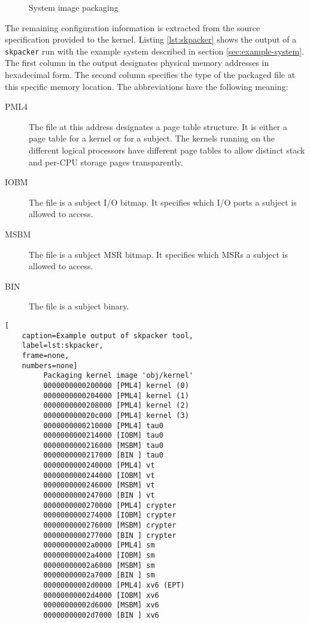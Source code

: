 \begin{figure}[h]
	\centering
	
	\caption{System image packaging}
	\label{fig:image-packaging}
\end{figure}

The remaining configuration information is extracted from the source
specification provided to the kernel. Listing \ref{lst:skpacker} shows the
output of a \texttt{skpacker} run with the example system described in section
\ref{sec:example-system}. The first column in the output designates physical
memory addresses in hexadecimal form. The second column specifies the type of
the packaged file at this specific memory location. The abbreviations have the
following meaning:

\begin{description}
	\item[PML4] The file at this address designates a page table structure. It
		is either a page table for a kernel or for a subject. The kernels
		running on the different logical processors have different page tables
		to allow distinct stack and per-CPU storage pages transparently.
	\item[IOBM] The file is a subject I/O bitmap. It specifies which I/O ports a
		subject is allowed to access.
	\item[MSBM] The file is a subject MSR bitmap. It specifies which MSRs a
		subject is allowed to access.
	\item[BIN] The file is a subject binary.
\end{description}

\begin{lstlisting}[
	caption=Example output of skpacker tool,
	label=lst:skpacker,
	frame=none,
	numbers=none]
         Packaging kernel image 'obj/kernel'
         0000000000200000 [PML4] kernel (0)
         0000000000204000 [PML4] kernel (1)
         0000000000208000 [PML4] kernel (2)
         000000000020c000 [PML4] kernel (3)
         0000000000210000 [PML4] tau0
         0000000000214000 [IOBM] tau0
         0000000000216000 [MSBM] tau0
         0000000000217000 [BIN ] tau0
         0000000000240000 [PML4] vt
         0000000000244000 [IOBM] vt
         0000000000246000 [MSBM] vt
         0000000000247000 [BIN ] vt
         0000000000270000 [PML4] crypter
         0000000000274000 [IOBM] crypter
         0000000000276000 [MSBM] crypter
         0000000000277000 [BIN ] crypter
         00000000002a0000 [PML4] sm
         00000000002a4000 [IOBM] sm
         00000000002a6000 [MSBM] sm
         00000000002a7000 [BIN ] sm
         00000000002d0000 [PML4] xv6 (EPT)
         00000000002d4000 [IOBM] xv6
         00000000002d6000 [MSBM] xv6
         00000000002d7000 [BIN ] xv6
\end{lstlisting}

